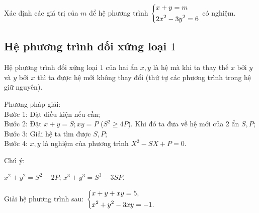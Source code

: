\begin{bt}%
Xác định các giá trị của $m$ để hệ phương trình $\left\{\begin{aligned}&x+y=m\\&2x^2-3y^2=6\end{aligned}\right.$ có nghiệm.
\end{bt}






\subsection{Hệ phương trình đối xứng loại $1$}
\begin{dn} Hệ phương trình đối xứng loại $1$ của hai ẩn $x, y$ là hệ mà khi ta thay thế $x$ bởi $y$ và $y$ bởi $x$ thì ta được hệ mới không thay đổi (thứ tự các phương trình trong hệ giữ nguyên).
\end{dn}
Phương pháp giải:\\
Bước 1: Đặt điều kiện nếu cần;\\
Bước 2: Đặt $x+y=S; xy=P$ ($S^2\geq 4P$). Khi đó ta đưa về hệ mới của 2 ẩn $S,P$;\\
Bước 3: Giải hệ ta tìm được $S,P$;\\
Bước 4: $x,y$ là  nghiệm của phương trình $X^2-SX+P=0$.\\
\begin{note}
Chú ý:
\begin{center}
$x^2+y^2=S^2-2P$;
$x^3+y^3=S^3-3SP$.
\end{center}
\end{note}

\begin{vd}%
Giải hệ phương trình sau: $\left\{\begin{aligned}&x+y+xy=5,\\ &x^2+y^2-3xy=-1.\end{aligned}\right.$
\end{vd}

